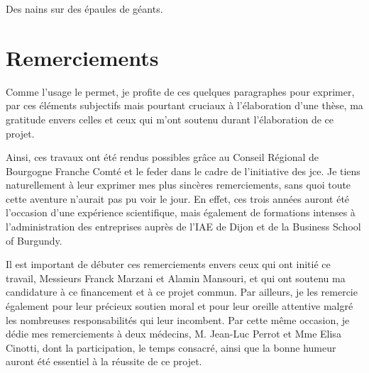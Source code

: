 \documentclass[english,standardlists]{spimubphdthesis}
\begin{document}
\dominitoc



	\parbox[t]{\textwidth}{
	\vspace{1.5cm}
		\begin{fquote}
			Des nains sur des épaules de géants.
		\end{fquote}	
	}
	
\chapter*{Remerciements}
Comme l'usage le permet, je profite de ces quelques paragraphes pour exprimer, par ces éléments subjectifs mais pourtant cruciaux à l'élaboration d'une thèse, ma gratitude envers celles et ceux qui m'ont soutenu durant l'élaboration de ce projet.\par

Ainsi, ces travaux ont été rendus possibles grâce au Conseil Régional de Bourgogne Franche Comté et le \gls{feder} dans le cadre de l'initiative des \gls{jce}. Je tiens naturellement à leur exprimer mes plus sincères remerciements, sans quoi toute cette aventure n'aurait pas pu voir le jour. En effet, ces trois années auront été l'occasion d'une expérience scientifique, mais également de formations intenses à l'administration des entreprises auprès de l'IAE de Dijon et de la Business School of Burgundy.\par

Il est important de débuter ces remerciements envers ceux qui ont initié ce travail, Messieurs Franck Marzani et Alamin Mansouri, et qui ont soutenu ma candidature à ce financement et à ce projet commun. Par ailleurs, je les remercie également pour leur précieux soutien moral et pour leur oreille attentive malgré les nombreuses responsabilités qui leur incombent. Par cette même occasion, je dédie mes remerciements à deux médecins, M. Jean-Luc Perrot et Mme Elisa Cinotti, dont la participation, le temps consacré, ainsi que la bonne humeur auront été essentiel à la réussite de ce projet.\par
\end{document}
